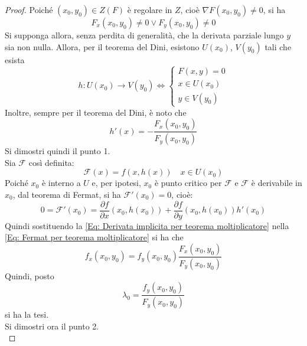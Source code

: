 \begin{proof}
    Poiché $(x_0, y_0) \in Z(F)$ è regolare in $Z$, cioè $\nabla F(x_0, y_0) \neq 0$, si ha 
    \begin{equation}
        F_x(x_0, y_0) \neq 0 \lor F_y(x_0, y_0) \neq 0
    \end{equation}
    Si supponga allora, senza perdita di generalità, che la derivata parziale lungo $y$ sia non nulla. Allora, per il teorema del Dini, esistono $U(x_0)$, $V(y_0)$ tali che esista
    \begin{equation}
    h:U(x_0) \to V(y_0) \iff \begin{cases}
        F(x, y)=0\\
        x\in U(x_0)\\
        y \in V(y_0)
    \end{cases}
    \end{equation}
    Inoltre, sempre per il teorema del Dini, è noto che
    \begin{equation} \label{Eq: Derivata implicita per teorema moltiplicatore}
        h'(x)=- \frac{F_x(x_0, y_0)}{F_y(x_0, y_0)} 
    \end{equation}
    Si dimostri quindi il punto 1.\\
    Sia $\mathcal{F}$ così definita:
    \begin{equation}
        \mathcal{F}(x)=f(x, h(x)) \quad x \in U(x_0)
    \end{equation}
    Poiché $x_0$ è interno a $U$ e, per ipotesi, $x_0$ è punto critico per $\mathcal{F}$ e $\mathcal{F}$ è derivabile in $x_0$, dal teorema di Fermat, si ha $\mathcal{F}'(x_0)=0$, cioè:
    \begin{equation}  \label{Eq: Fermat per teorema moltiplicatore}    0=\mathcal{F}'(x_0)=\frac{\partial{f}}{\partial{x}}(x_0, h(x_0))+ \frac{\partial{f}}{\partial{y}}(x_0, h(x_0))h'(x_0)
    \end{equation}
    Quindi sostituendo la \eqref{Eq: Derivata implicita per teorema moltiplicatore} nella \eqref{Eq: Fermat per teorema moltiplicatore} si ha che
    \begin{equation}
        f_x(x_0, y_0)={f_y(x_0, y_0)} \frac{F_x(x_0, y_0)}{F_y(x_0, y_0)}
    \end{equation}
    Quindi, posto
    \begin{equation}
        \lambda_0=\frac{f_y(x_0, y_0)}{F_y(x_0, y_0)}
    \end{equation}
    si ha la tesi.\\
    Si dimostri ora il punto 2.\\

\end{proof}
